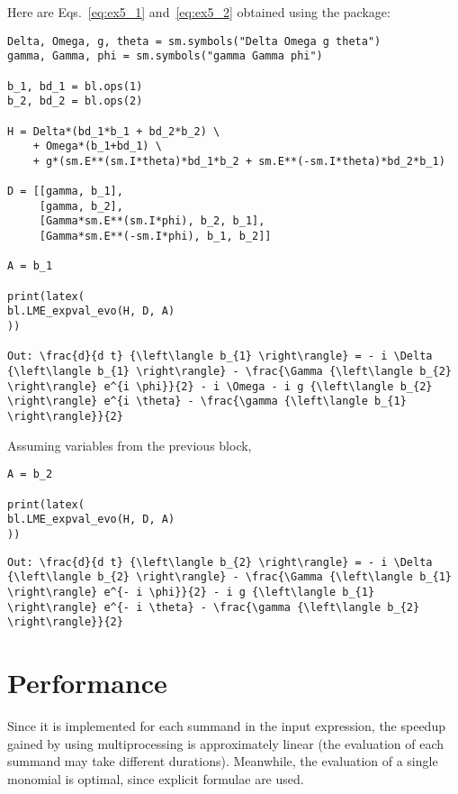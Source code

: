 \documentclass[5p, twocolumn, 10pt, sort&compress]{elsarticle}
\begin{document}
Here are Eqs.~\eqref{eq:ex5_1} and~\eqref{eq:ex5_2} obtained using the package:
\begin{verbatim}
Delta, Omega, g, theta = sm.symbols("Delta Omega g theta")
gamma, Gamma, phi = sm.symbols("gamma Gamma phi")

b_1, bd_1 = bl.ops(1)
b_2, bd_2 = bl.ops(2)

H = Delta*(bd_1*b_1 + bd_2*b_2) \
    + Omega*(b_1+bd_1) \
    + g*(sm.E**(sm.I*theta)*bd_1*b_2 + sm.E**(-sm.I*theta)*bd_2*b_1)

D = [[gamma, b_1],
     [gamma, b_2],
     [Gamma*sm.E**(sm.I*phi), b_2, b_1],
     [Gamma*sm.E**(-sm.I*phi), b_1, b_2]]

A = b_1

print(latex(
bl.LME_expval_evo(H, D, A)
))

Out: \frac{d}{d t} {\left\langle b_{1} \right\rangle} = - i \Delta {\left\langle b_{1} \right\rangle} - \frac{\Gamma {\left\langle b_{2} \right\rangle} e^{i \phi}}{2} - i \Omega - i g {\left\langle b_{2} \right\rangle} e^{i \theta} - \frac{\gamma {\left\langle b_{1} \right\rangle}}{2}
\end{verbatim}
Assuming variables from the previous block,
\begin{verbatim}
A = b_2

print(latex(
bl.LME_expval_evo(H, D, A)
))
\end{verbatim}

\newpage
\begin{verbatim}
Out: \frac{d}{d t} {\left\langle b_{2} \right\rangle} = - i \Delta {\left\langle b_{2} \right\rangle} - \frac{\Gamma {\left\langle b_{1} \right\rangle} e^{- i \phi}}{2} - i g {\left\langle b_{1} \right\rangle} e^{- i \theta} - \frac{\gamma {\left\langle b_{2} \right\rangle}}{2}
\end{verbatim}

\section{Performance}\label{section:performance}

Since it is implemented for each summand in the input expression, the speedup gained by using multiprocessing is approximately linear (the evaluation of each summand may take different durations). Meanwhile, the evaluation of a single monomial is optimal, since explicit formulae are used.
\end{document}

